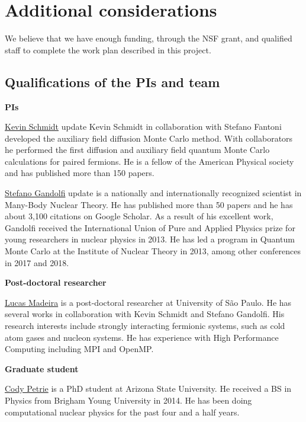 \documentclass[12pt,letterpaper]{article}
\begin{document}
\section{Additional considerations}

We believe that we have enough funding, through the NSF grant, and qualified 
staff to complete the work plan described in this project.

\subsection{Qualifications of the PIs and team}

\textbf{PIs}

\underline{Kevin Schmidt} {\color{red} update}
Kevin Schmidt in collaboration with Stefano Fantoni developed the
auxiliary field diffusion Monte Carlo method. With collaborators
he performed the first diffusion and auxiliary field quantum
Monte Carlo calculations for paired fermions.  He is a fellow of
the American Physical society and has published more than 150 papers.

\underline{Stefano Gandolfi} {\color{red} update} is a nationally and 
internationally recognized scientist in Many-Body Nuclear Theory.
He has published more than 50 papers and he has about 
3,100 citations on Google Scholar. As a result of his excellent work, 
Gandolfi received the International Union of Pure and Applied Physics prize 
for young researchers in nuclear physics in 2013. He has led a program in 
Quantum Monte Carlo at the Institute of Nuclear Theory in 2013, among other
conferences in 2017 and 2018.

\textbf{Post-doctoral researcher}

\underline{Lucas Madeira} is a post-doctoral researcher
at University of São Paulo.
He has several works in collaboration with Kevin Schmidt and Stefano
Gandolfi.
His research interests include strongly interacting fermionic systems, such as 
cold atom gases and nucleon systems.
He has experience with High Performance 
Computing including MPI and OpenMP.

\textbf{Graduate student}

\underline{Cody Petrie} is a PhD student at Arizona State University. He 
received a BS in Physics from Brigham Young University in 2014. He has been 
doing computational nuclear physics for the past four and a half years.

\vspace*{-0.5cm}



\end{document}

